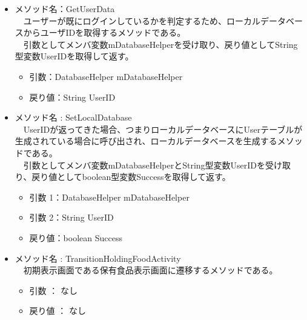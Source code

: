 \documentclass[a4j]{jarticle}
\begin{document}
\begin{itemize}
\item メソッド名：GetUserData\\
  　ユーザーが既にログインしているかを判定するため、ローカルデータベースからユーザIDを取得するメソッドである。\\
  　引数としてメンバ変数mDatabaseHelperを受け取り、戻り値としてString型変数UserIDを取得して返す。
  \begin{itemize}
  \item 引数：DatabaseHelper mDatabaseHelper
  \item 戻り値：String UserID
  \end{itemize}

\item メソッド名 : SetLocalDatabase\\
  　UserIDが返ってきた場合、つまりローカルデータベースにUserテーブルが生成されている場合に呼び出され、ローカルデータベースを生成するメソッドである。\\
  　引数としてメンバ変数mDatabaseHelperとString型変数UserIDを受け取り、戻り値としてboolean型変数Successを取得して返す。
  \begin{itemize}
  \item 引数 1：DatabaseHelper mDatabaseHelper
  \item 引数 2：String UserID
  \item 戻り値：boolean Success
  \end{itemize}

\item メソッド名 : TransitionHoldingFoodActivity\\
  　初期表示画面である保有食品表示画面に遷移するメソッドである。
  \begin{itemize}
  \item 引数 ： なし
  \item 戻り値 ： なし
  \end{itemize}
\end{itemize}
\end{document}
